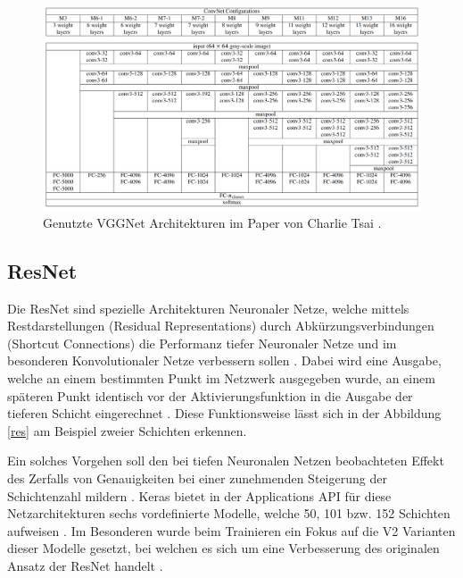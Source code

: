 \documentclass[twoside,a4paper]{IEEEtran}
\begin{document}
\begin{figure}[!htb]
	\centering
	\includegraphics[width=2.1\columnwidth]{conv_net_architectures}
	\caption{Genutzte VGGNet Architekturen im Paper von Charlie Tsai \cite[S.3]{RHC}.}
	\label{vggnet}
\end{figure}

\subsection{ResNet} %
Die ResNet sind spezielle Architekturen Neuronaler Netze, welche mittels Restdarstellungen (Residual Representations) durch Abkürzungsverbindungen (Shortcut Connections) die Performanz tiefer Neuronaler Netze und im besonderen Konvolutionaler Netze verbessern sollen \cite[S.1-2]{resnet}. Dabei wird eine Ausgabe, welche an einem bestimmten Punkt im Netzwerk ausgegeben wurde, an einem späteren Punkt identisch vor der Aktivierungsfunktion in die Ausgabe der tieferen Schicht eingerechnet \cite[S.4]{resnet}. Diese Funktionsweise lässt sich in der Abbildung \ref{res} am Beispiel zweier Schichten erkennen.

Ein solches Vorgehen soll den bei tiefen Neuronalen Netzen beobachteten Effekt des Zerfalls von Genauigkeiten bei einer zunehmenden Steigerung der Schichtenzahl mildern \cite[S.1]{resnet}. Keras bietet in der Applications API für diese Netzarchitekturen sechs vordefinierte Modelle, welche 50, 101 bzw. 152 Schichten aufweisen \cite{resnet_keras}. Im Besonderen wurde beim Trainieren ein Fokus auf die V2 Varianten dieser Modelle gesetzt, bei welchen es sich um eine Verbesserung des originalen Ansatz der ResNet handelt \cite{resnetv2}.
\end{document}
